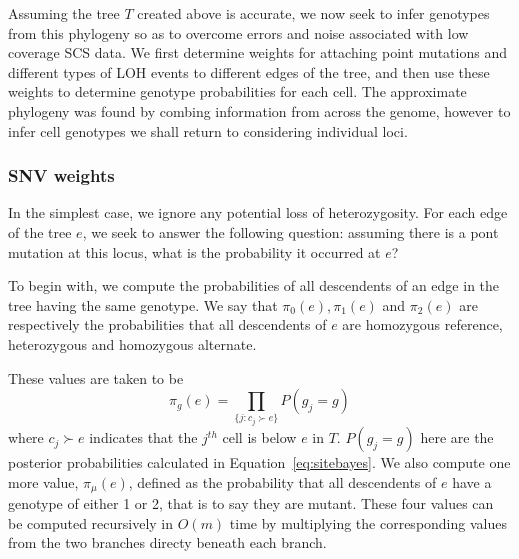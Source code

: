 \documentclass[../../main.tex]{subfiles}
\begin{document}
Assuming the tree $T$ created above is accurate, we now seek to infer genotypes from this phylogeny so as to overcome errors and noise associated with low coverage SCS data.
We first determine weights for attaching point mutations and different types of LOH events to different edges of the tree, and then use these weights to determine genotype probabilities for each cell.
The approximate phylogeny was found by combing information from across the genome, however to infer cell genotypes we shall return to considering individual loci.

\subsubsection{SNV weights}
In the simplest case, we ignore any potential loss of heterozygosity.
For each edge of the tree $e$, we seek to answer the following question: assuming there is a pont mutation at this locus, what is the probability it occurred at $e$?

To begin with, we compute the probabilities of all descendents of an edge in the tree having the same genotype.
We say that $\pi_0(e), \pi_1(e)$ and $\pi_2(e)$ are respectively the probabilities that all descendents of $e$ are homozygous reference, heterozygous and homozygous alternate.

These values are taken to be
\begin{equation*}
\pi_g(e) = \prod_{\{j:c_j\succ e\}} P(g_j = g)
\end{equation*}
where $c_j\succ e$ indicates that the $j^{th}$ cell is below $e$ in $T$.
$P(g_j = g)$ here are the posterior probabilities calculated in Equation~\eqref{eq:sitebayes}.
We also compute one more value, $\pi_\mu(e)$, defined as the probability that all descendents of $e$ have a genotype of either 1 or 2, that is to say they are mutant.
These four values can be computed recursively in $O(m)$ time by multiplying the corresponding values from the two branches directy beneath each branch.
\end{document}

